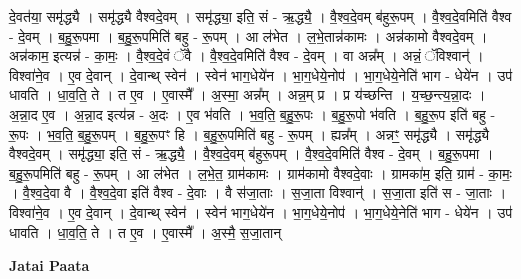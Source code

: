 \documentclass[17pt]{extarticle}
\begin{document}
दे॒वत॑या॒ समृ॑द्ध्यै । समृ॑द्ध्यै वैश्वदे॒वम् । समृ॑द्ध्या॒ इति॒ सं - ऋ॒द्ध्यै॒ । वै॒श्व॒दे॒वम् ब॑हुरू॒पम् । वै॒श्व॒दे॒वमिति॑ वैश्व - दे॒वम् । ब॒हु॒रू॒पमा । ब॒हु॒रू॒पमिति॑ बहु - रू॒पम् । आ ल॑भेत । ल॒भे॒तान्न॑कामः । अन्न॑कामो वैश्वदे॒वम् । अन्न॑काम॒ इत्यन्न॑ - का॒मः॒ । वै॒श्व॒दे॒वं ॅवै । वै॒श्व॒दे॒वमिति॑ वैश्व - दे॒वम् । वा अन्न᳚म् । अन्नं॒ ॅविश्वान्॑ । विश्वा॑ने॒व । ए॒व दे॒वान् । दे॒वान्थ् स्वेन॑ । स्वेन॑ भाग॒धेये॑न । भा॒ग॒धेये॒नोप॑ । भा॒ग॒धेये॒नेति॑ भाग - धेये॑न । उप॑ धावति । धा॒व॒ति॒ ते । त ए॒व । ए॒वास्मै᳚ । अ॒स्मा॒ अन्न᳚म् । अन्न॒म् प्र । प्र य॑च्छन्ति । य॒च्छ॒न्त्य॒न्ना॒दः । अ॒न्ना॒द ए॒व । अ॒न्ना॒द इत्य॑न्न - अ॒दः । ए॒व भ॑वति । भ॒व॒ति॒ ब॒हु॒रू॒पः । ब॒हु॒रू॒पो भ॑वति । ब॒हु॒रू॒प इति॑ बहु - रू॒पः । भ॒व॒ति॒ ब॒हु॒रू॒पम् । ब॒हु॒रू॒पꣳ हि । ब॒हु॒रू॒पमिति॑ बहु - रू॒पम् । ह्यन्न᳚म् । अन्नꣳ॒॒ समृ॑द्ध्यै । समृ॑द्ध्यै वैश्वदे॒वम् । समृ॑द्ध्या॒ इति॒ सं - ऋ॒द्ध्यै॒ । वै॒श्व॒दे॒वम् ब॑हुरू॒पम् । वै॒श्व॒दे॒वमिति॑ वैश्व - दे॒वम् । ब॒हु॒रू॒पमा । ब॒हु॒रू॒पमिति॑ बहु - रू॒पम् । आ ल॑भेत । ल॒भे॒त॒ ग्राम॑कामः । ग्राम॑कामो वैश्वदे॒वाः । ग्रामका॑म॒ इति॒ ग्राम॑ - का॒मः॒ । वै॒श्व॒दे॒वा वै । वै॒श्व॒दे॒वा इति॑ वैश्व - दे॒वाः । वै स॑जा॒ताः । स॒जा॒ता विश्वान्॑ । स॒जा॒ता इति॑ स - जा॒ताः । विश्वा॑ने॒व । ए॒व दे॒वान् । दे॒वान्थ् स्वेन॑ । स्वेन॑ भाग॒धेये॑न । भा॒ग॒धेये॒नोप॑ । भा॒ग॒धेये॒नेति॑ भाग - धेये॑न । उप॑ धावति । धा॒व॒ति॒ ते । त ए॒व । ए॒वास्मै᳚ । अ॒स्मै॒ स॒जा॒तान् \newline

\textbf{Jatai Paata} \newline
\end{document}
